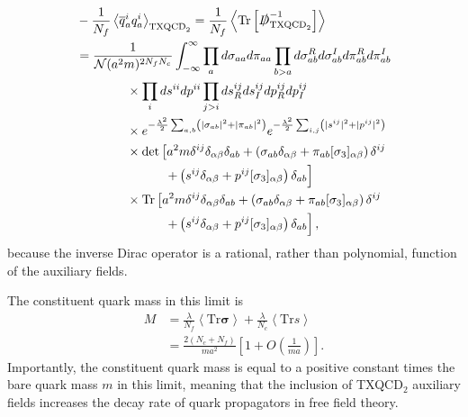 \documentclass[%
    twocolumn,
superscriptaddress,
preprintnumbers,
nofootinbib,
 amsmath,amssymb,
 aps,
 prd,
 floatfix,
]{revtex4-2}
\newcommand{\txqcd}[0]{\text{TXQCD}}
\begin{document}
\begin{equation}
  \begin{split}
    &-\frac{1}{N_f}\left< \overline{q}^i_a q^i_a \right>_{\txqcd_2} = \frac{1}{N_f} \left< \text{Tr}\left[ \slashed{D}_{\txqcd_2}^{-1} \right] \right> \\
    &= \frac{1}{\mathcal{N} (a^2 m)^{2N_f N_c}} \int_{-\infty}^{\infty} \prod_a d\sigma_{aa}d\pi_{aa} \prod_{b>a} d\sigma_{ab}^R d\sigma_{ab}^I d\pi_{ab}^R d\pi_{ab}^I \\ 
    &\hspace{40pt}\times \prod_i ds^{ii}dp^{ii} \prod_{j>i} ds^{ij}_R ds^{ij}_I dp^{ij}_R dp^{ij}_I \\
    &\hspace{40pt} \times  e^{-\frac{\lambda^2}{2} \sum_{a,b} \left( |\sigma_{ab}|^2 + |\pi_{ab}|^2 \right)} e^{-\frac{\lambda^2}{2} \sum_{i,j} \left( |s^{ij}|^2 + |p^{ij}|^2 \right) } \\
    &\hspace{40pt} \times \det\left[a^2 m \delta^{ij}\delta_{\alpha\beta}\delta_{ab}  + \left(\sigma_{ab}\delta_{\alpha\beta} + \pi_{ab} [\sigma_3]_{\alpha\beta}\right)\delta^{ij} \right. \\
    &\hspace{70pt} \left. + \left(s^{ij}\delta_{\alpha\beta} + p^{ij} [\sigma_3]_{\alpha\beta}\right)\delta_{ab} \vphantom{A_{ab\alpha\beta}^{ij}}\right] \\
    &\hspace{40pt} \times \text{Tr}\left[a^2 m \delta^{ij}\delta_{\alpha\beta}\delta_{ab}  + \left(\sigma_{ab}\delta_{\alpha\beta} + \pi_{ab} [\sigma_3]_{\alpha\beta}\right)\delta^{ij} \right. \\
    &\hspace{70pt} \left. + \left(s^{ij}\delta_{\alpha\beta} + p^{ij} [\sigma_3]_{\alpha\beta}\right)\delta_{ab} \vphantom{A_{ab\alpha\beta}^{ij}}\right],
  \end{split}
\end{equation}
because the inverse Dirac operator is a rational, rather than polynomial, function of the auxiliary fields.

The constituent quark mass in this limit is
\begin{equation}
  \begin{split}
    M &= \frac{\lambda}{N_f}\left< \text{Tr}\bm{\sigma} \right> + \frac{\lambda}{N_c} \left< \text{Tr} s \right> \\
    &= \frac{2(N_c + N_f)}{m a^2} \left[ 1 + O\left(\frac{1}{ma}\right) \right].
  \end{split}
\end{equation}
Importantly, the constituent quark mass is equal to a positive constant times the bare quark mass $m$ in this limit, meaning that the inclusion of TXQCD$_2$ auxiliary fields increases the decay rate of quark propagators in free field theory.
\end{document}
